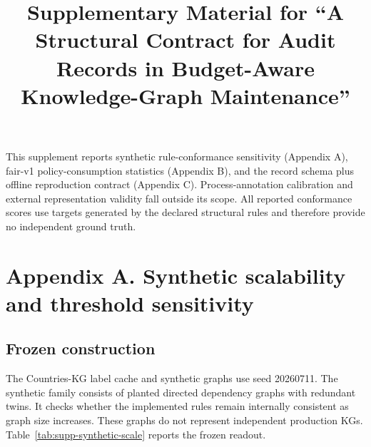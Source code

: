 \documentclass[pdflatex,sn-basic]{sn-jnl}
\begin{document}
\title[Supplementary Material]{Supplementary Material for ``A Structural Contract for Audit Records in Budget-Aware Knowledge-Graph Maintenance''}

\author*[1]{ }
\author[1,2]{ }


\maketitle

This supplement reports synthetic rule-conformance sensitivity (Appendix A), fair-v1 policy-consumption statistics (Appendix B), and the record schema plus offline reproduction contract (Appendix C). Process-annotation calibration and external representation validity fall outside its scope. All reported conformance scores use targets generated by the declared structural rules and therefore provide no independent ground truth.

\section{Appendix A. Synthetic scalability and threshold sensitivity}
\label{app:synthetic-scalability}

\subsection{Frozen construction}

The Countries-KG label cache and synthetic graphs use seed 20260711. The synthetic family consists of planted directed dependency graphs with redundant twins. It checks whether the implemented rules remain internally consistent as graph size increases. These graphs do not represent independent production KGs. Table~\ref{tab:supp-synthetic-scale} reports the frozen readout.
\end{document}
